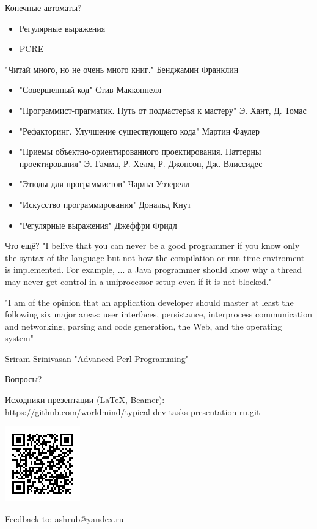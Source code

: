 \documentclass[aspectratio=169]{beamer}
\begin{document}
\begin{frame}{Конечные автоматы?}
\begin{itemize}
\item Регулярные выражения
\pause
\item PCRE
\end{itemize}
\end{frame}

\begin{frame}{"Читай много, но не очень много книг." Бенджамин Франклин}
\begin{itemize}
\item "Совершенный код" Стив Макконнелл
\pause
\item "Программист-прагматик. Путь от подмастерья к мастеру" Э. Хант, Д. Томас
\pause
\item "Рефакторинг. Улучшение существующего кода" Мартин Фаулер
\pause
\item "Приемы объектно-ориентированного проектирования. Паттерны проектирования" Э. Гамма, Р. Хелм, Р. Джонсон, Дж. Влиссидес
\pause
\item "Этюды для программистов" Чарльз Уэзерелл
\pause
\item "Искусство программирования" Дональд Кнут
\pause
\item "Регулярные выражения" Джеффри Фридл
\end{itemize}
\end{frame}

\begin{frame}{Что ещё?}
"I belive that you can never be a good programmer if you know only the syntax of the language but not how the compilation or run-time enviroment is implemented. For example, ... a Java programmer should know why a thread may never get control in a uniprocessor setup even if it is not blocked."

"I am of the opinion that an application developer should master at least the following six major areas: user interfaces, persistance, interprocess communication and networking, parsing and code generation, the Web, and the operating system"

Sriram Srinivasan "Advanced Perl Programming"
\end{frame}

\begin{frame}{Вопросы?}
\begin{block}{Исходники презентации (LaTeX, Beamer):}
https://github.com/worldmind/typical-dev-tasks-presentation-ru.git
\begin{center}
\includegraphics{qr-git-url.png}
\end{center}
\end{block}
\begin{block}{Feedback to: ashrub@yandex.ru}
\end{block}

\end{frame}
\end{document}
